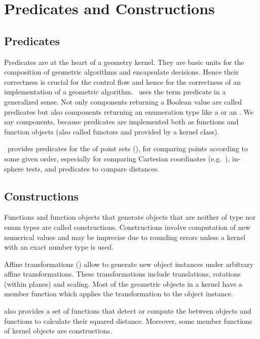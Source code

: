 \section{Predicates and Constructions}

\subsection{Predicates}
Predicates are at the heart of a geometry kernel. They are basic units
for the composition of geometric algorithms and encapsulate
decisions.  Hence their correctness is crucial for the control flow
and hence for the correctness of an implementation of a geometric
algorithm. \cgal\ uses the term predicate in a generalized sense. Not
only components returning a Boolean value are called predicates but
also components returning an enumeration type like a
 or an .  We say components,
because predicates are implemented both as functions and function
objects (also called functors and provided by a kernel class).

\cgal\ provides predicates for the  of
point sets (), for comparing points according to some
given order, especially for comparing Cartesian coordinates
(e.g.~), in-sphere tests, and
predicates to compare distances.

\subsection{Constructions}
Functions and function objects that generate objects that are neither
of type  nor enum types are called constructions.
Constructions involve computation of new numerical values and may be
imprecise due to rounding errors unless a kernel with an exact number
type is used.

Affine transformations () allow to
generate new object instances under arbitrary affine transformations.
These transformations include translations, rotations (within planes)
and scaling. Most of the geometric objects in a kernel have a member
function  which applies the
transformation to the object instance.

{\cgal} also provides a set of functions that detect or compute the
 between objects
and functions to calculate their squared
distance.  Moreover, some
member functions of kernel objects are constructions.

